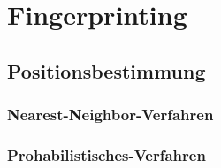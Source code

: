 \chapter{Fingerprinting}
\label{chap:fingerprinting}

\section{Positionsbestimmung}
\label{sec:fingerprinting:positioning}

\subsection{Nearest-Neighbor-Verfahren}
\label{sec:fingerprinting:positioning:nearestneighbor}

\subsection{Prohabilistisches-Verfahren}
\label{sec:fingerprinting:positioning:prohabilistic}
